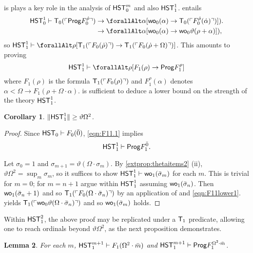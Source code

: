 \documentclass[UKenglish,cleveref,DIV=12]{scrartcl}
\let\forall\forallAlt
\newtheorem{lemma}{Lemma}
\newtheorem{corollary}[lemma]{Corollary}
\theoremstyle{definition}
\theoremstyle{definition}
\begin{document}
 is plays a key role in the analysis of $\mathsf{HST}_0^m$ and also $\mathsf{HST}_1^1$.  entails
\begin{align*}
 \HST_0^1\proves\T_0(\gn{\Prog  F_0^{\dot\rho}})
	&\rightarrow {\forall\alpha[\wo_0(\alpha)\rightarrow \T_0(\gn{F_0^{\dot\rho}(\dot\alpha)})]}).\\
	&\rightarrow {\forall\alpha[\wo_0(\alpha)\rightarrow \wo_0\vartheta(\rho+\alpha)]}),
\end{align*}
so $\HST_1^1\proves \forall\rho[\T_1(\gn{F_0(\dot\rho)})\rightarrow \T_1(\gn{F_0(\dot\rho+\Omega)})]$. This amounts to proving
\begin{align}\label{eqn:F11.1}
  \HST_1^1\proves \forall\rho[{F_1(\rho)}\rightarrow \Prog  F_1^\rho]
\end{align}
where $F_1(\rho)$ is the formula $\mathsf{T}_1(\ulcorner{F_0(\rho)}\urcorner)$ and
$F_1^\rho(\alpha)$ denotes $\alpha<\Omega\rightarrow F_1(\rho+\Omega\cdot\alpha)$.
 is sufficient to deduce a lower bound on the strength of the
theory $\mathsf{HST}_1^1$.
\begin{corollary}\label{extcor:F11lowerbound}
  $\lVert{\mathsf{HST}_1^1}\rVert\ge\vartheta\Omega^2$.
\end{corollary}
\begin{proof}
Since $\mathsf{HST}_0\vdash F_0(\bar0)$, \cref{eqn:F11.1} implies
\begin{gather}\label{eqn:F11lower1}
 \mathsf{HST}_1^1\vdash \mathsf{Prog}  F^{\bar 0}_1.
\end{gather}

Let $\sigma_0=1$ and $\sigma_{m+1}=\vartheta(\Omega\cdot\sigma_m)$. By
\cref{extprop:thetaitems2} (ii), $\vartheta\Omega^2=\sup_m\sigma_m$, so it
suffices to show $\mathsf{HST}_1^1\vdash\mathsf{wo}_1(\bar\sigma_m)$ for each $m$. This is
trivial for $m=0$; for $m=n+1$ argue within $\mathsf{HST}_1^1$ assuming
$\mathsf{wo}_1(\bar\sigma_n)$. Then $\mathsf{wo}_1(\bar\sigma_n+1)$ and so $\mathsf{T}_1(\ulcorner{F_0(\Omega\cdot\bar\sigma_n)}\urcorner)$
by an application of  and \cref{eqn:F11lower1}.  yields $\mathsf{T}_1(\ulcorner{\mathsf{wo}_0\vartheta(\Omega\cdot\bar\sigma_n)}\urcorner)$ and so $\mathsf{wo}_1(\bar\sigma_m)$
holds.
\end{proof}
Within $\mathsf{HST}_1^2$, the above proof may be replicated under a $\mathsf{T}_1$ predicate,
allowing one to reach ordinals beyond $\vartheta\Omega^2$, as the next
proposition demonstrates.
\begin{lemma}\label{extprop:F1wellordering}
For each $m$, $\mathsf{HST}_1^{m+1}\vdash F_1(\Omega^2\cdot\bar m)$ and $\mathsf{HST}_1^{m+1}\vdash \mathsf{Prog}  F_1^{\Omega^2\cdot\bar m}$.
\end{lemma}
\end{document}
